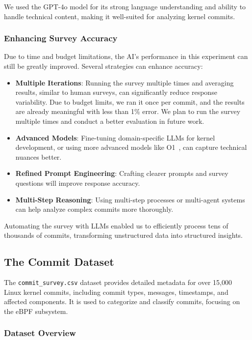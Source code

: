 We used the GPT-4o model for its strong language understanding and ability to handle technical content, making it well-suited for analyzing kernel commits.

\subsubsection{Enhancing Survey Accuracy}

Due to time and budget limitations, the AI's performance in this experiment can still be greatly improved. Several strategies can enhance accuracy:

\begin{itemize}
\item \textbf{Multiple Iterations}: Running the survey multiple times and averaging results, similar to human surveys, can significantly reduce response variability. Due to budget limits, we ran it once per commit, and the results are already meaningful with less than 1\% error. We plan to run the survey multiple times and conduct a better evaluation in future work.
\item \textbf{Advanced Models}: Fine-tuning domain-specific LLMs for kernel development, or using more advanced models like O1~\cite{o1}, can capture technical nuances better.
\item \textbf{Refined Prompt Engineering}: Crafting clearer prompts and survey questions will improve response accuracy.
\item \textbf{Multi-Step Reasoning}: Using multi-step processes or multi-agent systems can help analyze complex commits more thoroughly.
\end{itemize}

Automating the survey with LLMs enabled us to efficiently process tens of thousands of commits, transforming unstructured data into structured insights.

\subsection{The Commit Dataset}

The \texttt{commit\_survey.csv} dataset provides detailed metadata for over 15,000 Linux kernel commits, including commit types, messages, timestamps, and affected components. It is used to categorize and classify commits, focusing on the eBPF subsystem.

\subsubsection{Dataset Overview}

